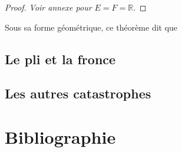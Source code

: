 \documentclass{article}
\newcommand{\R}{\mathbb{R}}
\theoremstyle{definition}
\theoremstyle{plain}
\begin{document}
\begin{proof}
	\textit{Voir annexe pour $E=F=\R$}.
\end{proof}

Sous sa forme géométrique, ce théorème dit que

\subsection{Le pli et la fronce}
\subsection{Les autres catastrophes}

\section{Bibliographie}

\renewcommand\refname{\vskip -1cm}


\end{document}
